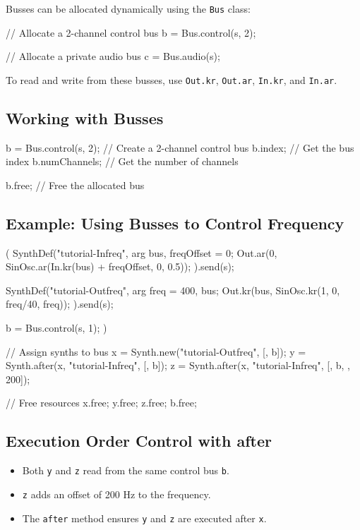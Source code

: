 Busses can be allocated dynamically using the \texttt{Bus} class:

\begin{supercollider*}
// Allocate a 2-channel control bus
b = Bus.control(s, 2);

// Allocate a private audio bus
c = Bus.audio(s);
\end{supercollider*}

To read and write from these busses, use \texttt{Out.kr}, \texttt{Out.ar}, \texttt{In.kr}, and \texttt{In.ar}.

\subsection{Working with Busses}

\begin{supercollider*}
b = Bus.control(s, 2); // Create a 2-channel control bus
b.index; // Get the bus index
b.numChannels; // Get the number of channels

b.free; // Free the allocated bus
\end{supercollider*}

\subsection{Example: Using Busses to Control Frequency}

\begin{supercollider*}
(
SynthDef("tutorial-Infreq", { arg bus, freqOffset = 0;
    Out.ar(0, SinOsc.ar(In.kr(bus) + freqOffset, 0, 0.5));
}).send(s);

SynthDef("tutorial-Outfreq", { arg freq = 400, bus;
    Out.kr(bus, SinOsc.kr(1, 0, freq/40, freq));
}).send(s);

b = Bus.control(s, 1);
)

// Assign synths to bus
x = Synth.new("tutorial-Outfreq", [\bus, b]);
y = Synth.after(x, "tutorial-Infreq", [\bus, b]);
z = Synth.after(x, "tutorial-Infreq", [\bus, b, \freqOffset, 200]);

// Free resources
x.free; y.free; z.free; b.free;
\end{supercollider*}

\subsection{Execution Order Control with after}

\begin{itemize}
    \item Both \texttt{y} and \texttt{z} read from the same control bus \texttt{b}.
    \item \texttt{z} adds an offset of 200 Hz to the frequency.
    \item The \texttt{after} method ensures \texttt{y} and \texttt{z} are executed after \texttt{x}.
\end{itemize}

